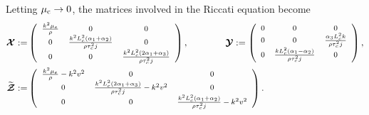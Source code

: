 \documentclass[10pt]{article}
\begin{document}
Letting $\mu_{\rm c}\to 0$, the matrices involved in the Riccati equation become
\begin{align}\label{Xc}
	\boldsymbol{\mathcal{X}}:=&\begin{footnotesize}\left(
		\begin{array}{ccc}
			\frac{k^2 \mu _e}{\rho } & 0 & 0 \\
			0 & \frac{k^2L_c^2 \left(\alpha _1  +\alpha _2  \right)}{\rho  \tau _c^2 j} & 0 \\
			0 & 0 & \frac{k^2L_c^2 \left(2 \alpha _1 +\alpha _3  \right)}{\rho  \tau _c^2 j} \\
		\end{array}
		\right)\end{footnotesize}, \qquad \qquad 
	\boldsymbol{\mathcal{Y}}:= \begin{footnotesize}\left(
		\begin{array}{ccc}
			0 & 0 & 0 \\
			0 & 0 & \frac{\alpha _3 L_c^2 k  }{\rho  \tau _c^2 j} \\
			0 & \frac{kL_c^2 \left(\alpha _1  -\alpha _2 \right)}{\rho  \tau _c^2 j} & 0 \\
		\end{array}
		\right)\end{footnotesize},\notag\\
	\widetilde{	\boldsymbol{\mathcal{Z}}}:=&\begin{footnotesize}\left(
		\begin{array}{ccc}
			\frac{k^2 \mu _e}{\rho }-k^2 v^2 & 0 & 0 \\
			0 & \frac{k^2 L_c^2\left(2 \alpha _1  +\alpha _3 \right)}{\rho  \tau _c^2 j}-k^2 v^2 & 0 \\
			0 & 0 & \frac{k^2L_c^2 \left(\alpha _1  +\alpha _2 \right)}{\rho  \tau _c^2 j}-k^2 v^2 \\
		\end{array}
		\right)\end{footnotesize}.
\end{align}
\end{document}
